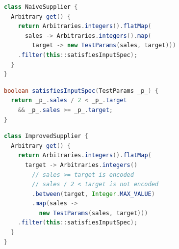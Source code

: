 {
\begin{genericfloat}[t]
\newpage{}
\noindent
\begin{minipage}[t]{0.48\textwidth}

\begin{lstlisting}[language=Java, caption={\VariantNaive{} supplier for \textit{good performance} inputs.
    The supplier generates random inputs and then filters them to only test values that match the input specification.
    }, label=lst:naive-supplier]
class NaiveSupplier {
  Arbitrary get() {
    return Arbitraries.integers().flatMap(
      sales -> Arbitraries.integers().map(
        target -> new TestParams(sales, target)))
    .filter(this::satisfiesInputSpec);
  }
}
\end{lstlisting}

\begin{lstlisting}[language=Java, caption={Input filter for the \textit{good performance} case.}, label=lst:java-input-encoding]
boolean satisfiesInputSpec(TestParams _p_) {
  return _p_.sales / 2 < _p_.target
    && _p_.sales >= _p_.target;
}
\end{lstlisting}

\end{minipage}
\hfill
\begin{minipage}[t]{0.48\textwidth}

\begin{lstlisting}[language=Java, caption={\VariantImproved{} supplier for \textit{good performance} inputs.
    The supplier partially encodes the input specification during generation, reducing filtering failures compared to \VariantNaive{}.
    }, label=lst:improved-supplier]
class ImprovedSupplier {
  Arbitrary get() {
    return Arbitraries.integers().flatMap(
      target -> Arbitraries.integers()
        // sales >= target is encoded
        // sales / 2 < target is not encoded
        .between(target, Integer.MAX_VALUE)
        .map(sales -> 
          new TestParams(sales, target)))
    .filter(this::satisfiesInputSpec);
  }
}
\end{lstlisting}

\end{minipage}
\end{genericfloat}
}

